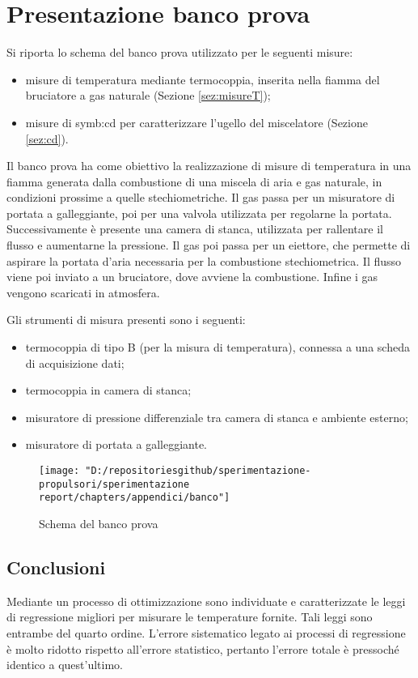\section{Presentazione banco prova}\label{app:banco}
Si riporta lo schema del banco prova utilizzato per le seguenti misure:
\begin{itemize}
	\item misure di temperatura mediante termocoppia, inserita nella fiamma del
	bruciatore a gas naturale (Sezione \ref{sez:misureT});
	\item misure di \gls{symb:cd} per caratterizzare l'ugello del miscelatore (Sezione \ref{sez:cd}).
\end{itemize}

Il banco prova ha come obiettivo la realizzazione di misure di temperatura in una fiamma generata dalla combustione di una miscela di aria e gas naturale, in condizioni prossime a quelle stechiometriche. 
Il gas passa per un misuratore di portata a galleggiante, poi per una valvola utilizzata per regolarne la portata. Successivamente è presente una camera di stanca, utilizzata per rallentare il flusso e aumentarne la pressione. Il gas poi passa per un eiettore, che permette di aspirare la portata d'aria necessaria per la combustione stechiometrica. Il flusso viene poi inviato a un bruciatore, dove avviene la combustione. Infine i gas vengono scaricati in atmosfera. 

Gli strumenti di misura presenti sono i seguenti:
\begin{itemize}
	\item termocoppia di tipo B (per la misura di temperatura), connessa a una scheda di acquisizione dati;
	\item termocoppia in camera di stanca;
	\item misuratore di pressione differenziale tra camera di stanca e ambiente esterno;
	\item misuratore di portata a galleggiante.
\end{itemize}
\begin{figure}[H]
	\centering
	\texttt{[image: "D:/repositoriesgithub/sperimentazione-propulsori/sperimentazione report/chapters/appendici/banco"]}
	\caption{Schema del banco prova}
	\label{fig:banco}
\end{figure}

\subsection{Conclusioni}
Mediante un processo di ottimizzazione sono individuate e caratterizzate le leggi di regressione migliori per misurare le temperature fornite. Tali leggi sono entrambe del quarto ordine. L'errore sistematico legato ai processi di regressione è molto ridotto rispetto all'errore statistico, pertanto l'errore totale è pressoché identico a quest'ultimo. 